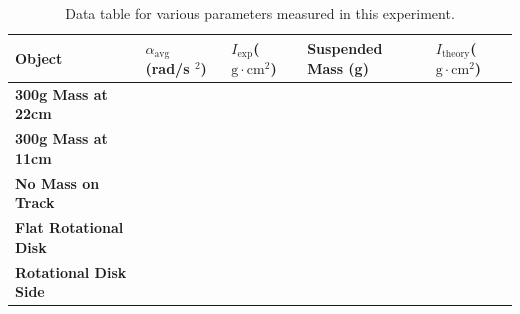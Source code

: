 \begin{center}
\begin{table}
\begin{tabular}{| C{4.5cm} | C{2.6cm} | C{2.6cm} | C{2.6cm} | C{2.6cm} |}
\hline
Object & $\alpha _\text{avg}$ (rad/s $^{2}$) & $I_\text{exp}$($\text{g} \cdot \text{cm} ^{2}$) & Suspended Mass (g) & $I_\text{theory}$($\text{g} \cdot \text{cm}^2$)\\ \hline
 \textbf{300g Mass at 22cm}& & &&\\ \hline
 \textbf{300g Mass at 11cm}& && &\\ \hline
 \textbf{No Mass on Track}& && &\\ \hline
 \textbf{Flat Rotational Disk}& & &&\\ \hline
 \textbf{Rotational Disk Side} & & &&\\ \hline
\end{tabular}
\captionsetup{justification=centering}
\caption{Data table for various parameters measured in this experiment.}
\label{sectab}
\end{table}
\end{center}